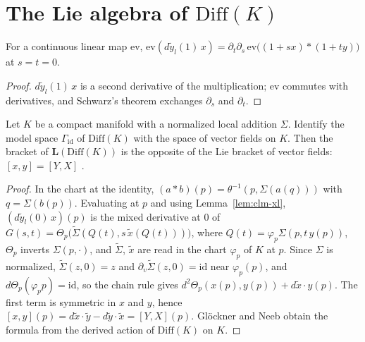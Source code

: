 \section{The Lie algebra of \texorpdfstring{$\mathrm{Diff}(K)$}{Diff(K)}}

\begin{lemma}
  \label{lem:clm-xl}
  \leanok
  For a continuous linear map $\mathrm{ev}$,
  $\mathrm{ev}(d\tilde y_l(1)\,x) = \partial_t \partial_s\, \mathrm{ev}\bigl((1 + sx) * (1 + ty)\bigr)$
  at $s = t = 0$.
\end{lemma}

\begin{proof}
  \leanok
  $d\tilde y_l(1)\,x$ is a second derivative of the multiplication; $\mathrm{ev}$ commutes with
  derivatives, and Schwarz's theorem exchanges $\partial_s$ and $\partial_t$.
\end{proof}

\begin{theorem}[$\mathbf{L}(\mathrm{Diff}(K)) = \mathcal{V}(K)^{\mathrm{op}}$]
  \label{thm:lie-diff}
  \leanok
  Let $K$ be a compact manifold with a normalized local addition $\Sigma$. Identify the model
  space $\Gamma_{\mathrm{id}}$ of $\mathrm{Diff}(K)$ with the space of vector fields on $K$. Then
  the bracket of $\mathbf{L}(\mathrm{Diff}(K))$ is the opposite of the Lie bracket of vector
  fields: $[x, y] = [Y, X]$ \cite[Example 5.4.3]{GN26}.
\end{theorem}

\begin{proof}
  \leanok
  In the chart at the identity, $(a * b)(p) = \theta^{-1}(p, \Sigma(a(q)))$ with
  $q = \Sigma(b(p))$. Evaluating at $p$ and using Lemma~\ref{lem:clm-xl},
  $(d\tilde y_l(0)\,x)(p)$ is the mixed derivative at $0$ of
  $G(s, t) = \Theta_p\bigl(\tilde\Sigma(Q(t), s\,\tilde x(Q(t)))\bigr)$, where
  $Q(t) = \varphi_p \Sigma(p, t\,y(p))$, $\Theta_p$ inverts $\Sigma(p, \cdot)$, and $\tilde\Sigma$,
  $\tilde x$ are read in the chart $\varphi_p$ of $K$ at $p$. Since $\Sigma$ is normalized,
  $\tilde\Sigma(z, 0) = z$ and $\partial_v \tilde\Sigma(z, 0) = \mathrm{id}$ near $\varphi_p(p)$,
  and $d\Theta_p(\varphi_p p) = \mathrm{id}$, so the chain rule gives
  $d^2\Theta_p(x(p), y(p)) + d\tilde x \cdot y(p)$. The first term is symmetric in $x$ and
  $y$, hence $[x, y](p) = d\tilde x\cdot \tilde y - d\tilde y \cdot \tilde x = [Y, X](p)$.
  Glöckner and Neeb obtain the formula from the derived action of $\mathrm{Diff}(K)$ on $K$.
\end{proof}

